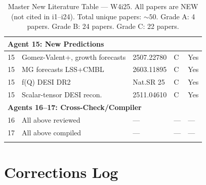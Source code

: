 \documentclass[11pt]{article}
\begin{document}
\begin{longtable}{p{}p{}p{}p{}p{}}
\multicolumn{5}{l}{\textbf{Agent 15: New Predictions}} \\
\midrule
15 & Gomez-Valent+, growth forecasts & 2507.22780 & C & Yes \\
15 & MG forecasts LSS+CMBL & 2603.11895 & C & Yes \\
15 & f(Q) DESI DR2 & Nat.SR 25 & C & Yes \\
15 & Scalar-tensor DESI recon. & 2511.04610 & C & Yes \\
\midrule

\multicolumn{5}{l}{\textbf{Agents 16--17: Cross-Check/Compiler}} \\
\midrule
16 & All above reviewed & --- & --- & --- \\
17 & All above compiled & --- & --- & --- \\
\bottomrule

\caption{Master New Literature Table --- W4i25. All papers are NEW
(not cited in i1--i24). Total unique papers: $\sim 50$.
Grade A: 4 papers. Grade B: 24 papers. Grade C: 22 papers.}
\end{longtable}


\section{Corrections Log}
\end{document}
